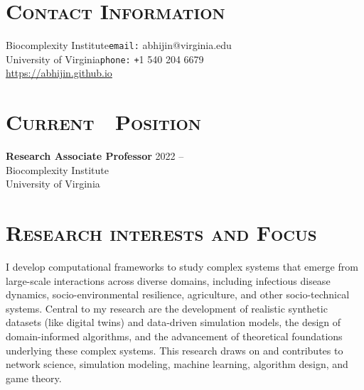 \documentclass[margin,10pt]{res}
\begin{document}
\begin{resume}

\section{\textnormal{\textsc{Contact Information}}}
Biocomplexity Institute\hfill \texttt{email:}
abhijin@virginia.edu\hspace{0mm}\mbox{}\\
University of Virginia\hfill \texttt{phone:}
\texttt{+}1 540 204 6679\hspace{6.5mm}\mbox{}\\
\url{https://abhijin.github.io}
\section{\textnormal{\textsc{Current\,\,\,\, Position}}}
\textbf{Research Associate Professor} \hfill 2022 -- \\
Biocomplexity Institute\\
University of Virginia
\section{\textnormal{\textsc{Research interests and Focus}}}
I develop computational frameworks to study complex systems that emerge
from large-scale interactions across diverse domains, including infectious
disease dynamics, socio-environmental resilience, agriculture, and other
socio-technical systems.  Central to my research are the development of
realistic synthetic datasets (like digital twins) and data-driven
simulation models, the design of domain-informed algorithms, and the
advancement of theoretical foundations underlying these complex systems.
This research draws on and contributes to network science, simulation
modeling, machine learning, algorithm design, and game theory.\\


\end{resume}
\end{document}

